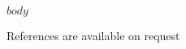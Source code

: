 \documentclass[11pt, a4paper]{article}
\title{\titlefont{$title$}} %
\date{$if(date)$$date$\\$endif$} %
\author{$address$\\$if(address2)$$address2$\\$endif$
$email$\\
$phone$}
\begin{document}
\maketitle
\vspace{-2em}
\recomputelengths
$body$
 
\vfill

References are available on request
\end{document}
